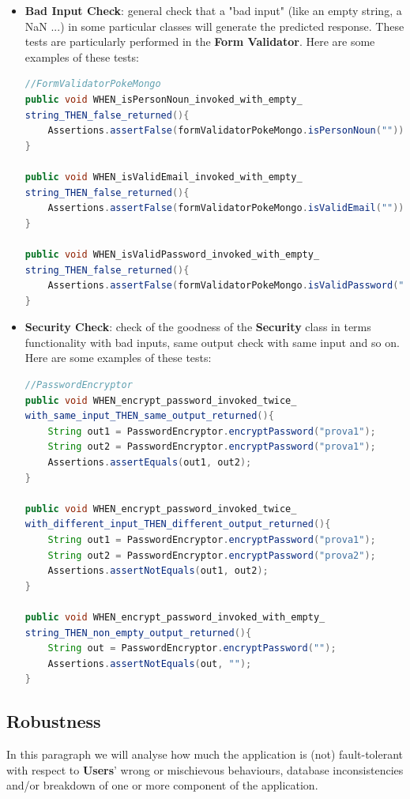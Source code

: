 \begin{itemize}
	\item \textbf{Bad Input Check}: general check that a "bad input" (like an empty string, a NaN ...) in some particular classes will generate the predicted response. These tests are particularly performed in the \textbf{Form Validator}. Here are some examples of these tests:
\begin{lstlisting}[language=Java]
//FormValidatorPokeMongo
public void WHEN_isPersonNoun_invoked_with_empty_
string_THEN_false_returned(){
	Assertions.assertFalse(formValidatorPokeMongo.isPersonNoun(""));
}

public void WHEN_isValidEmail_invoked_with_empty_
string_THEN_false_returned(){
	Assertions.assertFalse(formValidatorPokeMongo.isValidEmail(""));
}

public void WHEN_isValidPassword_invoked_with_empty_
string_THEN_false_returned(){
	Assertions.assertFalse(formValidatorPokeMongo.isValidPassword(""));
}

\end{lstlisting} 
	\item \textbf{Security Check}: check of the goodness of the \textbf {Security} class in terms functionality with bad inputs, same output check with same input and so on. Here are some examples of these tests:
\begin{lstlisting}[language=Java]
//PasswordEncryptor
public void WHEN_encrypt_password_invoked_twice_
with_same_input_THEN_same_output_returned(){
	String out1 = PasswordEncryptor.encryptPassword("prova1");
	String out2 = PasswordEncryptor.encryptPassword("prova1");
	Assertions.assertEquals(out1, out2);
}

public void WHEN_encrypt_password_invoked_twice_
with_different_input_THEN_different_output_returned(){
	String out1 = PasswordEncryptor.encryptPassword("prova1");
	String out2 = PasswordEncryptor.encryptPassword("prova2");
	Assertions.assertNotEquals(out1, out2);
}

public void WHEN_encrypt_password_invoked_with_empty_
string_THEN_non_empty_output_returned(){
	String out = PasswordEncryptor.encryptPassword("");
	Assertions.assertNotEquals(out, "");
}
\end{lstlisting}
\end{itemize}
\subsection{Robustness}
In this paragraph we will analyse how much the application is (not) fault-tolerant with respect to \textbf{Users}’ wrong or mischievous behaviours, database inconsistencies and/or breakdown of one or more component of the application.

